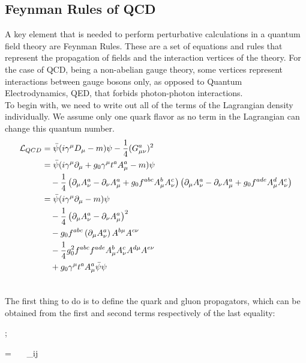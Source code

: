 \subsection{Feynman Rules of QCD}
A key element that is needed to perform perturbative calculations in a quantum field theory are Feynman Rules. These are a set of equations and rules that represent the propagation of fields and the interaction vertices of the theory. For the case of QCD, being a non-abelian gauge theory, some vertices represent interactions between gauge bosons only, as opposed to Quantum Electrodynamics, QED, that forbids photon-photon interactions. \\
To begin with, we need to write out all of the terms of the Lagrangian density individually. We assume only one quark flavor as no term in the Lagrangian can change this quantum number.
\begin{align}\nonumber
    \mathcal{L}_{QCD} &= \bar{\psi}(i\gamma^\mu D_\mu - m)\psi -\frac{1}{4}(G_{\mu\nu}^a)^2 \\\nonumber
    &= \bar{\psi}(i\gamma^\mu \partial_\mu  + g_0\gamma^\mu t^aA_\mu^a - m)\psi \\\nonumber
    &~~~-\frac{1}{4}\left( \partial_\mu A_\nu^a - \partial_\nu A_\mu^a + g_0f^{abc}A_\mu^b A_\nu^c \right) \left(\partial_\mu A_\nu^a - \partial_\nu A_\mu^a + g_0f^{ade}A_\mu^d A_\nu^e \right) \\\nonumber
    &= \bar{\psi}(i\gamma^\mu\partial_\mu - m)\psi \label{lagr:expanded} \\
    &~~~-\frac{1}{4}\left(\partial_\mu A_\nu^a - \partial_\nu A_\mu^a\right)^2 \\\nonumber
    &~~~- g_0f^{abc}\left(\partial_\mu A^a_\nu \right) A^{b\mu} A^{c\nu} \\\nonumber
    &~~~-\frac{1}{4}g_0^2f^{abc}f^{ade}A_\mu^bA_\nu^cA^{d\mu}A^{e\nu}  \\\nonumber
    &~~~+g_0\gamma^\mu t^a A_\mu^a \bar{\psi}\psi \\\nonumber
\end{align}

The first thing to do is to define the quark and gluon propagators, which can be obtained from the first and second terms respectively of the last equality:

\begin{minipage}{0.4\textwidth}
\begin{center}
    ;     
\end{center}
\end{minipage}
\begin{minipage}{0.58\textwidth}
        \beq \nonumber = ~~~\delta_{ij} ~~~~~~~~~~~~~~~~~~~~~~~~~~~~~\eeq
\end{minipage} 

